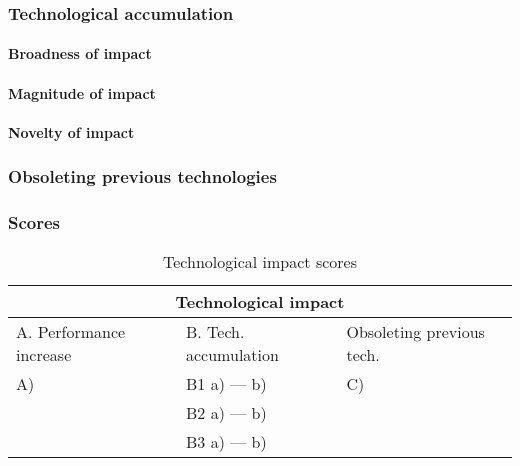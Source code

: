 \subsubsection{Technological accumulation}
\paragraph{Broadness of impact}

\paragraph{Magnitude of impact}

\paragraph{Novelty of impact}

\subsubsection{Obsoleting previous technologies}

\subsubsection{Scores}
\begin{table}[h]
\centering
\begin{tabular}{l l l}
\hline
\multicolumn{3}{|c|}{Technological impact} \\
\hline
A. Performance increase & B. Tech. accumulation & Obsoleting previous tech.\\
A)   & B1 a)  --- b)  & C) \\ 
     & B2 a)  --- b)  & \\
     & B3 a)  --- b)  & \\
\hline
\end{tabular}
\caption{Technological impact scores}
\label{tbl:impactscores4}
\end{table}